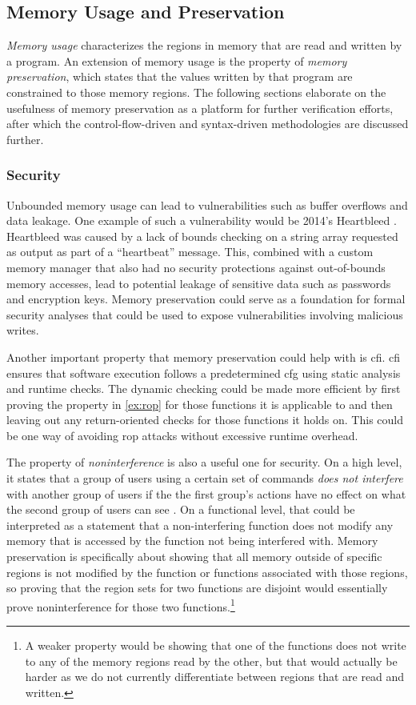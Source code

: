 \subsection{Memory Usage and Preservation}\label{memory_usage}
\emph{Memory usage} characterizes the regions in memory that are read
and written by a program.
An extension of memory usage is the property of \emph{memory preservation},
which states that the values written by that program are constrained
to those memory regions.
The following sections elaborate on the usefulness of memory preservation
as a platform for further verification efforts,
after which the control-flow-driven and syntax-driven methodologies
are discussed further.

\subsubsection{Security}
Unbounded memory usage can lead to vulnerabilities
such as buffer overflows and data leakage.
One example of such a vulnerability would be 2014's Heartbleed \autocite{heartbleed}.
Heartbleed was caused by a lack of bounds checking on a string array
requested as output as part of a ``heartbeat'' message.
This, combined with a custom memory manager
that also had no security protections against out-of-bounds memory accesses,
lead to potential leakage of sensitive data such as passwords and encryption keys.
Memory preservation could serve as a foundation for formal security analyses
that could be used to expose vulnerabilities involving malicious writes.

Another important property that memory preservation could help with
is \ac{cfi}. \Ac{cfi} ensures that software execution
follows a predetermined \ac{cfg} using static analysis and runtime checks.
The dynamic checking could be made more efficient
by first proving the property in \cref{ex:rop} for those functions it is applicable to
and then leaving out any return-oriented checks for those functions it holds on.
This could be one way of avoiding \ac{rop} attacks without excessive runtime overhead.

The property of \emph{noninterference} is also a useful one for security.
On a high level, it states that a group of users using a certain set of commands
\emph{does not interfere} with another group of users if the the first group's actions
have no effect on what the second group of users can see
\autocite{goguen1982security,rushby1992noninterference}.
On a functional level, that could be interpreted as a statement that a non-interfering function does not modify any memory that is accessed
by the function not being interfered with.
Memory preservation is specifically about showing that all memory outside of
specific regions is not modified by the function
or functions associated with those regions, so proving that the region sets
for two functions are disjoint
would essentially prove noninterference for those two functions.\footnote{%
  A weaker property would be showing that one of the functions does not write
  to any of the memory regions read by the other, but that would actually be harder
  as we do not currently differentiate between regions that are read and written.%
}

